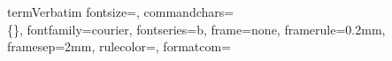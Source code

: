 \newcommand{\il}{\lstinline}
\newcommand{\lpQuestion}{\stepcounter{lpCount}\begin{multicols}{2}{\sq{\tiny\nhex{2}{\arabic{lpCount}}}}}
\newcommand{\lpQuestionN}{\begin{multicols}{2}}
\newcommand{\lpMonoQuestion}{\stepcounter{lpCount}\sq{\tiny\nhex{2}{\arabic{lpCount}}}}
\newcommand{\lpAnswer}{\hspace*{\fill}\vspace*{\fill}\columnbreak\\}
\newcommand{\lpAnswernowords}{\hspace*{\fill}\vspace*{\fill}\columnbreak\\\vspace*{-2em}}
\newcommand{\lpEnd}{\end{multicols}}
\newcommand{\lpNext}{\lpEnd\hrule\lpQuestion}
\newcommand{\lpNextN}{\lpEnd\hrule\lpQuestionN}
\newcommand{\askfirst}{\lpQuestion}
\newcommand{\ask}{\lpNext}
\newcommand{\answer}{\lpAnswer}
\newcommand{\answernowords}{\lpAnswernowords}
\newcommand{\askfirstN}{\lpQuestionN}
\newcommand{\askN}{\lpNextN}
\newcommand{\stopasking}{\lpEnd}

\DefineVerbatimEnvironment%
    {term}{Verbatim}
    {fontsize=\footnotesize, commandchars=\\\{\},
     fontfamily=courier, fontseries=b, frame=none, framerule=0.2mm,
    framesep=2mm, rulecolor=\color{MidnightBlue}, 
    formatcom=\color{MidnightBlue}
    }

\newcommand{\trm}[1]{\texttt{\footnotesize{\color{MidnightBlue}{#1}}}}
\newcommand{\key}[1]{\tc{orange}{#1}}
\newcommand{\returnkey}{\enskip{\key{$\hookleftarrow$}}}
\newcommand{\ltk}{\key{$\leftarrow$}}
\newcommand{\rtk}{\key{$\rightarrow$}}
\newcommand{\upk}{\key{$\uparrow$}}
\newcommand{\dnk}{\key{$\downarrow$}}
\newcommand{\tc}{\textcolor}
\newcommand{\wtf}{$\diamond$}
\newcommand{\etc}{$\hookleftarrow$}
\newcommand{\vd}{$\vdots$}

\renewcommand{\labelitemi}{$\rightarrow$}
\newsavebox{\lessonbox}
\newenvironment{lesson}
{\begin{lrbox}{\lessonbox}\begin{minipage}{0.9\linewidth}\medskip}
{\medskip\end{minipage}\end{lrbox}\framebox[1.1\width]{\usebox{\lessonbox}}}

